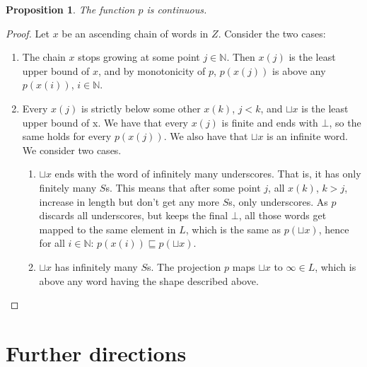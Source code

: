 \documentclass[a4paper]{article}
\newtheorem{thmPIsContinuous}[defNuF]{Proposition}
\begin{document}
\begin{thmPIsContinuous}

The function $p$ is continuous.

\end{thmPIsContinuous}

\begin{proof}

Let $x$ be an ascending chain of words in $Z$.  Consider the two cases:

\begin{enumerate}

  \item The chain $x$ stops growing at some point $j \in \mathbb{N}$. Then
  $x(j)$ is the least upper bound of $x$, and by monotonicity of $p$, $p(x(j))$
  is above any $p(x(i))$, $i \in \mathbb{N}$.

  \item Every $x(j)$ is strictly below some other $x(k)$, $j < k$, and $\sqcup
  x$ is the least upper bound of x.  We have that every $x(j)$ is finite and
  ends with $\bot$, so the same holds for every $p(x(j))$.  We also have that
  $\sqcup x$ is an infinite word.  We consider two cases.

    \begin{enumerate}

      \item $\sqcup x$ ends with the word of infinitely many underscores.  That
      is, it has only finitely many $S$s.  This means that after some point $j$,
      all $x(k)$, $k > j$, increase in length but don't get any more $S$s, only
      underscores.  As $p$ discards all underscores, but keeps the final $\bot$,
      all those words get mapped to the same element in $L$, which is the same
      as $p(\sqcup x)$, hence for all $i \in \mathbb{N}$: $p(x(i)) \sqsubseteq
      p(\sqcup x)$.

      \item $\sqcup x$ has infinitely many $S$s.  The projection $p$ maps
      $\sqcup x$ to $\infty \in L$, which is above any word having the shape
      described above.

    \end{enumerate}

\end{enumerate}

\end{proof}

\section{Further directions}
\end{document}
